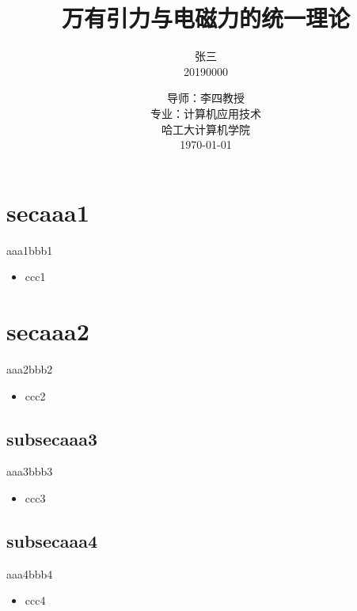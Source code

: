 \documentclass{ctexbeamer}
\title[统一理论]{万有引力与电磁力的统一理论} %
\author{\Large 张三{\small \\ 20190000}} %
\date{\songti 导师：李四教授\\ 专业：计算机应用技术\\ {\small 哈工大计算机学院}\\
  {\small \today}} %
\begin{document}
\begin{frame}[plain]
\titlepage
\end{frame}

\section[secaaa1]{secaaa1}
\begin{frame}{aaa1}{bbb1}
  \begin{itemize}
  \item ccc1
  \end{itemize}
\end{frame}

\section[secaaa2]{secaaa2}
\begin{frame}{aaa2}{bbb2}
  \begin{itemize}
  \item ccc2
  \end{itemize}
\end{frame}

\subsection[subsecaaa3]{subsecaaa3}
\begin{frame}{aaa3}{bbb3}
  \begin{itemize}
  \item ccc3
  \end{itemize}
\end{frame}

\subsection[subsecaaa4]{subsecaaa4}
\begin{frame}{aaa4}{bbb4}
  \begin{itemize}
  \item ccc4
  \end{itemize}
\end{frame}
\end{document}
